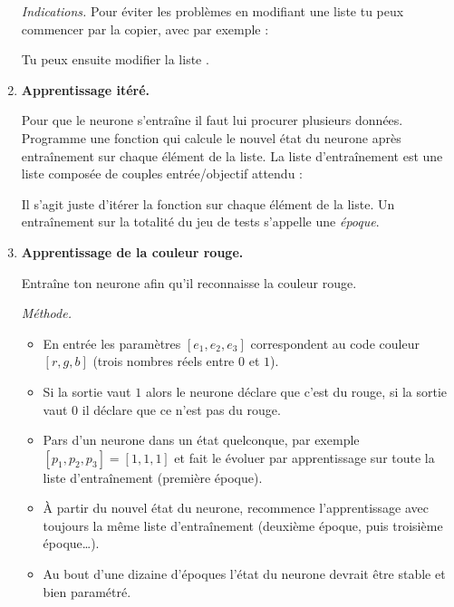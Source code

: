 \documentclass[10pt,class=report,crop=false]{standalone}
\begin{document}
\begin{activite}[Neurone]
\begin{enumerate}
\begin{itemize}
	\end{itemize}	
		
	
	\emph{Indications.} Pour éviter les problèmes en modifiant une liste tu peux commencer par la copier, avec par exemple :	
	
	Tu peux ensuite modifier la liste .
	
	\item  \textbf{Apprentissage itéré.}
	
	Pour que le neurone s'entraîne il faut lui procurer plusieurs données.
	Programme une fonction 
	qui calcule le nouvel état du neurone après entraînement sur chaque élément de la liste.
	La liste d'entraînement est une liste composée de couples entrée/objectif attendu : 	
	\mycenterline{\ci{[ ([1,0,0],1), ([0,1,1],0), ([0,1,0],0), ... ]}}
	
	Il s'agit juste d'itérer la fonction  sur chaque élément de la liste. 
	Un entraînement sur la totalité du jeu de tests s'appelle une \emph{époque}.
	
	\item  \textbf{Apprentissage de la couleur rouge.}
	
	Entraîne ton neurone afin qu'il reconnaisse la couleur rouge.
	
\medskip
	
	\emph{Méthode.}
	\begin{itemize}
		\item En entrée les paramètres $[e_1,e_2,e_3]$ correspondent au code couleur $[r,g,b]$ (trois nombres réels entre $0$ et $1$).
		\item Si la sortie vaut $1$ alors le neurone déclare que c'est du rouge, si la sortie vaut $0$ il déclare que ce n'est pas du rouge.
		\item Pars d'un neurone dans un état quelconque, par exemple $[p_1,p_2,p_3]=[1,1,1]$ et fait le évoluer par apprentissage sur toute la liste d'entraînement (première époque).
		\item \`A partir du nouvel état du neurone, recommence l'apprentissage avec toujours la même liste d'entraînement (deuxième époque, puis troisième époque\ldots). 
		\item Au bout d'une dizaine d'époques l'état du neurone devrait être stable et bien paramétré.
	\end{itemize}

\medskip


\end{enumerate}
\end{activite}
\end{document}
